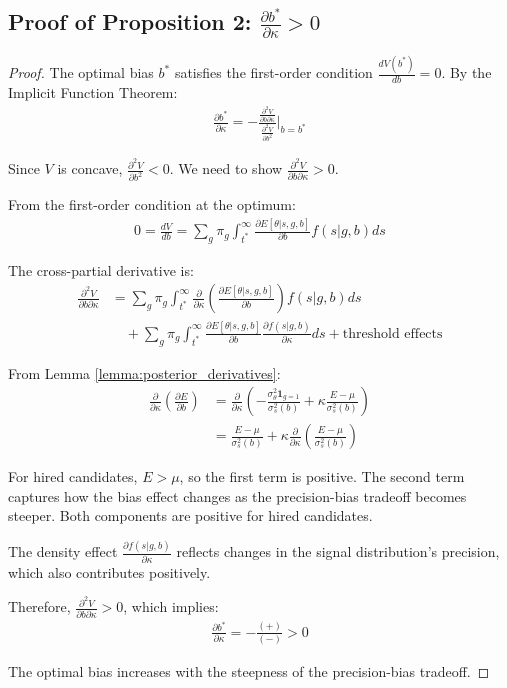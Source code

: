 \documentclass[12pt,a4paper]{article}
\theoremstyle{definition}
\theoremstyle{remark}
\begin{document}
\subsection{Proof of Proposition 2: $\frac{\partial b^*}{\partial \kappa} > 0$}

\begin{proof}
The optimal bias $b^*$ satisfies the first-order condition $\frac{dV(b^*)}{db} = 0$. By the Implicit Function Theorem:
\begin{align}
\frac{\partial b^*}{\partial \kappa} = -\frac{\frac{\partial^2 V}{\partial b \partial \kappa}}{\frac{\partial^2 V}{\partial b^2}}\bigg|_{b=b^*}
\end{align}

Since $V$ is concave, $\frac{\partial^2 V}{\partial b^2} < 0$. We need to show $\frac{\partial^2 V}{\partial b \partial \kappa} > 0$.

From the first-order condition at the optimum:
\begin{align}
0 = \frac{dV}{db} = \sum_{g} \pi_g \int_{t^*}^\infty \frac{\partial E[\theta|s,g,b]}{\partial b} f(s|g,b) ds
\end{align}

The cross-partial derivative is:
\begin{align}
\frac{\partial^2 V}{\partial b \partial \kappa} &= \sum_{g} \pi_g \int_{t^*}^\infty \frac{\partial}{\partial \kappa}\left(\frac{\partial E[\theta|s,g,b]}{\partial b}\right) f(s|g,b) ds \\
&\quad + \sum_{g} \pi_g \int_{t^*}^\infty \frac{\partial E[\theta|s,g,b]}{\partial b} \frac{\partial f(s|g,b)}{\partial \kappa} ds + \text{threshold effects}
\end{align}

From Lemma \ref{lemma:posterior_derivatives}:
\begin{align}
\frac{\partial}{\partial \kappa}\left(\frac{\partial E}{\partial b}\right) &= \frac{\partial}{\partial \kappa}\left(-\frac{\sigma_\theta^2 \mathbf{1}_{g=1}}{\sigma_s^2(b)} + \kappa \frac{E - \mu}{\sigma_s^2(b)}\right) \\
&= \frac{E - \mu}{\sigma_s^2(b)} + \kappa \frac{\partial}{\partial \kappa}\left(\frac{E - \mu}{\sigma_s^2(b)}\right)
\end{align}

For hired candidates, $E > \mu$, so the first term is positive. The second term captures how the bias effect changes as the precision-bias tradeoff becomes steeper. Both components are positive for hired candidates.

The density effect $\frac{\partial f(s|g,b)}{\partial \kappa}$ reflects changes in the signal distribution's precision, which also contributes positively.

Therefore, $\frac{\partial^2 V}{\partial b \partial \kappa} > 0$, which implies:
\begin{align}
\frac{\partial b^*}{\partial \kappa} = -\frac{(+)}{(-)} > 0
\end{align}

The optimal bias increases with the steepness of the precision-bias tradeoff.
\end{proof}
\end{document}
